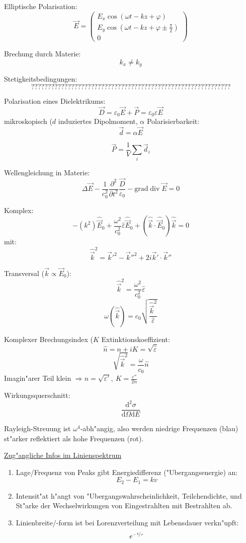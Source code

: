 \documentclass[12pt]{report}
\newcommand{\vepsilon}{\varepsilon}
\newcommand{\vphi}{\varphi}
\newcommand{\dd}{\mathrm{d}}
\begin{document}
Elliptische Polarisation:
\[\vec{E}=\begin{pmatrix}E_x\cos(\omega t-kz+\vphi)\\E_y\cos(\omega t-kz+\vphi\pm\frac{\pi}{2})\\0\end{pmatrix}\]

Brechung durch Materie:
\[k_x\neq k_y\]

Stetigkeitsbedingungen:
\[????????????????????????????????????????????????????????????\]

Polarisation eines Dielektrikums:
\[\vec{D}=\vepsilon_0\vec{E}+\vec{P}=\vepsilon_0\vepsilon\vec{E}\]
mikroskopisch ($d$ induziertes Dipolmoment, $\alpha$ Polarisierbarkeit:
\[\vec{d}=\alpha\vec{E}\]

\[\vec{P}=\frac{1}{V}\sum_i\vec{d}_i\]

Wellengleichung in Materie:
\[\Delta\vec{E}-\frac{1}{c_0^2}\frac{\partial^2}{\partial t^2}\frac{\vec{D}}{\vepsilon_0}-\mathrm{grad}\mathop\mathrm{div}\vec{E}=0\]

Komplex:
\[-(k^2)\hat{\vec{E}}_0+\frac{\omega^2}{c_0^2}\hat{\vepsilon}\hat{\vec{E}}_0+(\hat{\vec{k}}\cdot\hat{\vec{E}}_0)\hat{\vec{k}}=0\]
mit:
\[\hat{\vec{k}}^2=\vec{k}'^2-\vec{k}''^2+2i\vec{k}'\cdot\vec{k}''\]

Transversal ($\vec{k}\propto\vec{E}_0$):
\[\hat{\vec{k}}^2=\frac{\omega^2}{c_0^2}\hat{\vepsilon}\]
\[\omega(\hat{\vec{k}})=c_0\sqrt{\frac{\hat{\vec{k}}^2}{\hat{\vepsilon}}}\]

Komplexer Brechungsindex ($K$ Extinktionskoeffizient:
\[\hat{n}=n+iK=\sqrt{\hat{\vepsilon}}\]
\[\sqrt{\hat{\vec{k}}^2}=\frac{\omega}{c_0}\hat{n}\]
Imagin"arer Teil klein $\Rightarrow n=\sqrt{\vepsilon'},\ K=\frac{\vepsilon''}{2n}$

Wirkungsquerschnitt:
\[\frac{\dd^2\sigma}{\dd\Omega\dd E}\]

Rayleigh-Streuung ist $\omega^4$-abh"angig, also werden niedrige Frequenzen (blau) st"arker reflektiert als hohe Frequenzen (rot).

\underline{Zug"angliche Infos im Linienspektrum}
\begin{enumerate}
\item Lage/Frequenz von Peaks gibt Energiedifferenz ("Ubergangsenergie) an:
\[E_2-E_1=kv\]
\item Intensit"at h"angt von "Ubergangswahrscheinlichkeit, Teilchendichte, und St"arke der Wechselwirkungen von Eingestrahlten mit Bestrahlten ab.
\item Linienbreite/-form ist bei Lorenzverteilung mit Lebensdauer verkn"upft:
\[e^{-\nicefrac{t}{\tau}}\]
\end{enumerate}
\end{document}
